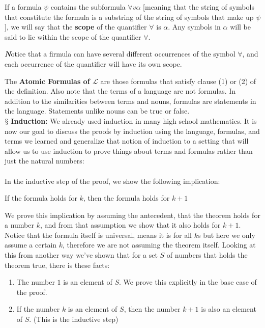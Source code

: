 \documentclass[9pt,a4paper, twocolumn]{article}
\newcounter{theo}
\newenvironment{callout}
	{\begin{calloutbox}\color{charcoal}\textbf\textit}
	{\end{calloutbox}}
\newcommand{\newpoint}[1]{\ \\ \indent$\mathsection$ \textbf{#1}}
\newcommand{\curveL}{\mathcal{L}}
\begin{document}
        If a formula $\psi$ contains the subformula $\forall v \alpha$ [meaning that the string of symbols that constitute the formula is a substring of the string of symbols that make up $\psi$], we will say that the \textbf{scope} of the quantifier $\forall$ is $\alpha$. Any symbols in $\alpha$ will be said to lie within the scope of the quantifier $\forall$.
        \begin{callout}
            Notice that a firmula can have several different occurrences of the symbol $\forall$, and each occurrence of the quantifier will have its own scope.
        \end{callout}
        The \textbf{Atomic Formulas of $\curveL$} are those formulas that satisfy clause (1) or (2) of the definition. Also note that the terms of a language are not formulas. In addition to the similarities between terms and nouns, formulas are statements in the language. Statements unlike nouns can be true or false. 
        \newpoint{Induction:} We already used induction in many high school mathematics. It is now our goal to discuss the proofs by induction using the language, formulas, and terms we learned and generalize that notion of induction to a setting that will allow us to use induction to prove things about terms and formulas rather than just the natural numbers:
        \\
        \\
        In the inductive step of the proof, we show the following implication:
        \begin{center}
            If the formula holds for $k$, then the formula holds for $k+1$
        \end{center}
        We prove this implication by assuming the antecedent, that the theorem holds for a number $k$, and from that assumption we show that it also holds for $k+1$. Notice that the formula itself is universal, means it is for all $k$s but here we only assume a certain $k$, therefore we are not assuming the theorem itself. Looking at this from another way we've shown that for a set $S$ of numbers that holds the theorem true, there is these facts:
        \begin{enumerate}
            \item The number $1$ is an element of $S$. We prove this explicitly in the base case of the proof.
            \item If the number $k$ is an element of $S$, then the number $k+1$ is also an element of $S$. (This is the inductive step)
        \end{enumerate}
\end{document}
